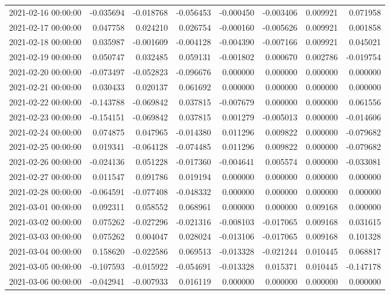 \begin{tabular}{lrrrrrrr}
2021-02-16 00:00:00 & -0.035694 & -0.018768 & -0.056453 & -0.000450 & -0.003406 & 0.009921 & 0.071958 \\
2021-02-17 00:00:00 & 0.047758 & 0.024210 & 0.026754 & -0.000160 & -0.005626 & 0.009921 & 0.001858 \\
2021-02-18 00:00:00 & 0.035987 & -0.001609 & -0.004128 & -0.004390 & -0.007166 & 0.009921 & 0.045021 \\
2021-02-19 00:00:00 & 0.050747 & 0.032485 & 0.059131 & -0.001802 & 0.000670 & 0.002786 & -0.019754 \\
2021-02-20 00:00:00 & -0.073497 & -0.052823 & -0.096676 & 0.000000 & 0.000000 & 0.000000 & 0.000000 \\
2021-02-21 00:00:00 & 0.030433 & 0.020137 & 0.061692 & 0.000000 & 0.000000 & 0.000000 & 0.000000 \\
2021-02-22 00:00:00 & -0.143788 & -0.069842 & 0.037815 & -0.007679 & 0.000000 & 0.000000 & 0.061556 \\
2021-02-23 00:00:00 & -0.154151 & -0.069842 & 0.037815 & 0.001279 & -0.005013 & 0.000000 & -0.014606 \\
2021-02-24 00:00:00 & 0.074875 & 0.047965 & -0.014380 & 0.011296 & 0.009822 & 0.000000 & -0.079682 \\
2021-02-25 00:00:00 & 0.019341 & -0.064128 & -0.074485 & 0.011296 & 0.009822 & 0.000000 & -0.079682 \\
2021-02-26 00:00:00 & -0.024136 & 0.051228 & -0.017360 & -0.004641 & 0.005574 & 0.000000 & -0.033081 \\
2021-02-27 00:00:00 & 0.011547 & 0.091786 & 0.019194 & 0.000000 & 0.000000 & 0.000000 & 0.000000 \\
2021-02-28 00:00:00 & -0.064591 & -0.077408 & -0.048332 & 0.000000 & 0.000000 & 0.000000 & 0.000000 \\
2021-03-01 00:00:00 & 0.092311 & 0.058552 & 0.068961 & 0.000000 & 0.000000 & 0.009168 & 0.000000 \\
2021-03-02 00:00:00 & 0.075262 & -0.027296 & -0.021316 & -0.008103 & -0.017065 & 0.009168 & 0.031615 \\
2021-03-03 00:00:00 & 0.075262 & 0.004047 & 0.028024 & -0.013106 & -0.017065 & 0.009168 & 0.101328 \\
2021-03-04 00:00:00 & 0.158620 & -0.022586 & 0.069513 & -0.013328 & -0.021244 & 0.010445 & 0.068817 \\
2021-03-05 00:00:00 & -0.107593 & -0.015922 & -0.054691 & -0.013328 & 0.015371 & 0.010445 & -0.147178 \\
2021-03-06 00:00:00 & -0.042941 & -0.007933 & 0.016119 & 0.000000 & 0.000000 & 0.000000 & 0.000000 \\

\end{tabular}
